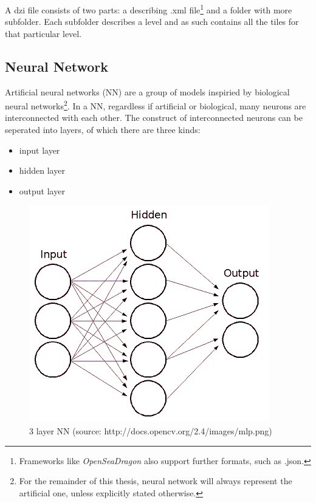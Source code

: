 A dzi file consists of two parts: a describing .xml file\footnote{Frameworks like \emph{OpenSeaDragon} also support further formats, such as .json.} and a folder with more subfolder. Each subfolder describes a level and as such contains all the tiles for that particular level.


\subsection{Neural Network}
Artificial neural networks (NN) are a group of models inspiried by biological neural networks\footnote{For the remainder of this thesis, neural network will always represent the artificial one, unless explicitly stated otherwise.}. In a NN, regardless if artificial or biological, many neurons are interconnected with each other. The construct of interconnected neurons can be seperated into layers, of which there are three kinds:

\begin{itemize}
	\item input layer
	\item hidden layer
	\item output layer
\end{itemize}

\begin{figure}[H]
	\begin{center}
		\includegraphics[scale=0.7]{img/mlp.png}
		\caption{3 layer NN (source: http://docs.opencv.org/2.4/\textunderscore images/mlp.png)}
		\label{fig:fig2.2}
	\end{center}
\end{figure}


